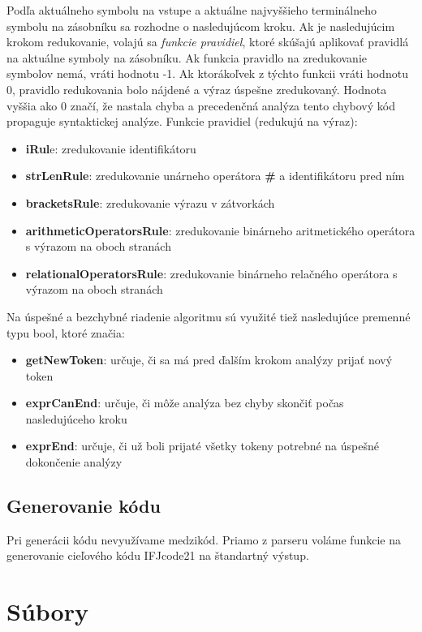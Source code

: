 \documentclass[a4paper, 12pt]{article}
\begin{document}
Podľa aktuálneho symbolu na vstupe a aktuálne najvyššieho terminálneho symbolu na zásobníku sa rozhodne o nasledujúcom kroku. Ak je nasledujúcim krokom redukovanie, volajú sa \emph{funkcie pravidiel}, ktoré skúšajú aplikovať pravidlá na aktuálne symboly na zásobníku. Ak funkcia pravidlo na zredukovanie symbolov nemá, vráti hodnotu -1. Ak ktorákoľvek z týchto funkcii vráti hodnotu 0, pravidlo redukovania bolo nájdené a výraz úspešne zredukovaný. Hodnota vyššia ako 0 značí, že nastala chyba a precedenčná analýza tento chybový kód propaguje syntaktickej analýze. Funkcie pravidiel (redukujú na výraz):
\begin{itemize}
    \item \textbf{iRul}e: zredukovanie identifikátoru
    \item \textbf{strLenRule}: zredukovanie unárneho operátora \textbf{\#} a identifikátoru pred ním
    \item \textbf{bracketsRule}: zredukovanie výrazu v zátvorkách
    \item \textbf{arithmeticOperatorsRule}: zredukovanie binárneho aritmetického operátora s výrazom na oboch stranách
    \item \textbf{relationalOperatorsRule}: zredukovanie binárneho relačného operátora s výrazom na oboch stranách
\end{itemize}

Na úspešné a bezchybné riadenie algoritmu sú využité tiež nasledujúce premenné typu bool, ktoré značia:
\begin{itemize}
    \item \textbf{getNewToken}: určuje, či sa má pred ďalším krokom analýzy prijať nový token
    \item \textbf{exprCanEnd}: určuje, či môže analýza bez chyby skončiť počas nasledujúceho kroku
    \item \textbf{exprEnd}: určuje, či už boli prijaté všetky tokeny potrebné na úspešné dokončenie analýzy
\end{itemize}
    

\subsection{Generovanie kódu}

Pri generácii kódu nevyužívame medzikód. Priamo z parseru voláme funkcie na generovanie cieľového kódu IFJcode21 na štandartný výstup.

\section{Súbory}
\end{document}
